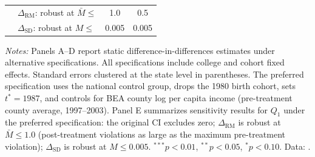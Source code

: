 \begin{table}[H]
\begin{threeparttable}
\begin{tabular}{llcccc}
 & $\Delta_\text{RM}$: robust at $\bar{M} \leq$ & \multicolumn{2}{c}{1.0} & \multicolumn{2}{c}{0.5} \\
 & $\Delta_\text{SD}$: robust at $M \leq$ & \multicolumn{2}{c}{0.005} & \multicolumn{2}{c}{0.005} \\
\bottomrule
\end{tabular}
\begin{tablenotes}[flushleft]
\footnotesize
\item \textit{Notes:} Panels A--D report static
  difference-in-differences estimates under alternative specifications.
  All specifications include college and cohort fixed effects. Standard
  errors clustered at the state level in parentheses. The preferred
  specification uses the national control group, drops the 1980 birth
  cohort, sets $t^* = 1987$, and controls for BEA county log per capita
  income (pre-treatment county average, 1997--2003). Panel E summarizes
  \textcite{rambachan2023more} sensitivity results for $Q_1$ under the
  preferred specification: the original CI excludes zero; $\Delta_\text{RM}$
  is robust at $\bar{M} \leq 1.0$ (post-treatment violations as large as
  the maximum pre-treatment violation); $\Delta_\text{SD}$ is robust at
  $M \leq 0.005$. $^{***}p<0.01$, $^{**}p<0.05$, $^{*}p<0.10$.
  Data: \textcite{chetty2020mobility}.
\end{tablenotes}
\end{threeparttable}
\end{table}

